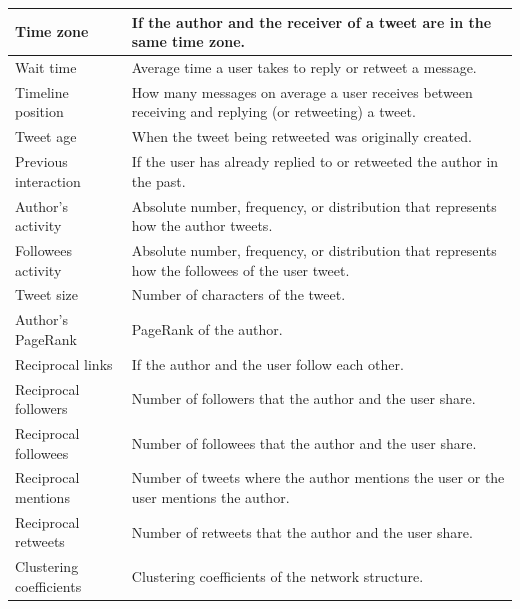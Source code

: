 \begin{table}[htbp]
\begin{tabular}{|>{\raggedright\centering\arraybackslash}m{1.5cm}|m{6.8cm}|}
		Time zone 																					& If the author and the receiver of a tweet are in the same time zone. \cite{Luo2013} \\ \hline
		Wait time 																					& Average time a user takes to reply or retweet a message. \cite{Comarela2012,Hong2011} \\ \hline
		Timeline position 													& How many messages on average a user receives between receiving and replying (or retweeting) a tweet. \cite{Comarela2012} \\ \hline
		Tweet age 																					& When the tweet being retweeted was originally created. \cite{Comarela2012,Hong2011} \\ \hline
		Previous interaction 																& If the user has already replied to or retweeted the author in the past. \cite{Comarela2012,Luo2013,Wang2012} \\ \hline
		Author's activity 																	& Absolute number, frequency, or distribution that represents how the author tweets. \cite{Comarela2012,Hong2011,Liu2013,Luo2013,Peng2011,Petrovic2011,Suh2010,Wang2012} \\ \hline
		Followees activity 																	& Absolute number, frequency, or distribution that represents how the followees of the user tweet. \cite{Peng2011} \\ \hline
		Tweet size 																					& Number of characters of the tweet. \cite{Comarela2012,Petrovic2011} \\ \hline
		Author's PageRank 																	& PageRank of the author. \cite{Hong2011,Wang2012} \\ \hline
		Reciprocal links 
																		& If the author and the user follow each other. \cite{Hong2011,Peng2011,Wang2012} \\ \hline
		Reciprocal followers 																& Number of followers that the author and the user share. \cite{Peng2011,Wang2012} \\ \hline
		Reciprocal followees 																& Number of followees that the author and the user share. \cite{Peng2011,Wang2012} \\ \hline
		Reciprocal mentions 																& Number of tweets where the author mentions the user or the user mentions the author. \cite{Peng2011} \\ \hline
		Reciprocal retweets 																& Number of retweets that the author and the user share. \cite{Peng2011} \\ \hline
		Clustering coefficients 															& Clustering coefficients of the network structure. \cite{Hong2011} \\ \hline

\end{tabular}
\end{table}
